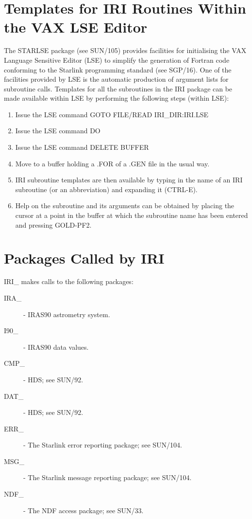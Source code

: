\section{Templates for IRI Routines Within the VAX LSE Editor}
The STARLSE package (see SUN/105) provides facilities for initialising the VAX
Language Sensitive Editor (LSE) to simplify the generation of Fortran
code conforming to the Starlink programming standard (see SGP/16). One of the
facilities provided by LSE is the automatic production of argument lists for
subroutine calls. Templates for all the subroutines in the IRI package can be 
made available within LSE by performing the following steps (within LSE):
\begin{enumerate}
\item Issue the LSE command GOTO FILE/READ IRI\_DIR:IRI.LSE
\item Issue the LSE command DO
\item Issue the LSE command DELETE BUFFER
\item Move to a buffer holding a .FOR of a .GEN file in the usual way.
\item IRI subroutine templates are then available by typing in the name of an 
IRI subroutine (or an abbreviation) and expanding it (CTRL-E).
\item Help on the subroutine and its arguments can be obtained by placing the
cursor at a point in the buffer at which the subroutine name has been entered 
and pressing GOLD-PF2.
\end{enumerate}

\section{Packages Called by IRI}
IRI\_ makes calls to the following packages:
\begin {description}
\item [IRA\_] - IRAS90 astrometry system.
\item [I90\_] - IRAS90 data values.
\item [CMP\_] - HDS; see SUN/92.
\item [DAT\_] - HDS; see SUN/92.
\item [ERR\_] - The Starlink error reporting package; see SUN/104.
\item [MSG\_] - The Starlink message reporting package; see SUN/104.
\item [NDF\_] - The NDF access package; see SUN/33.
\end{description}


